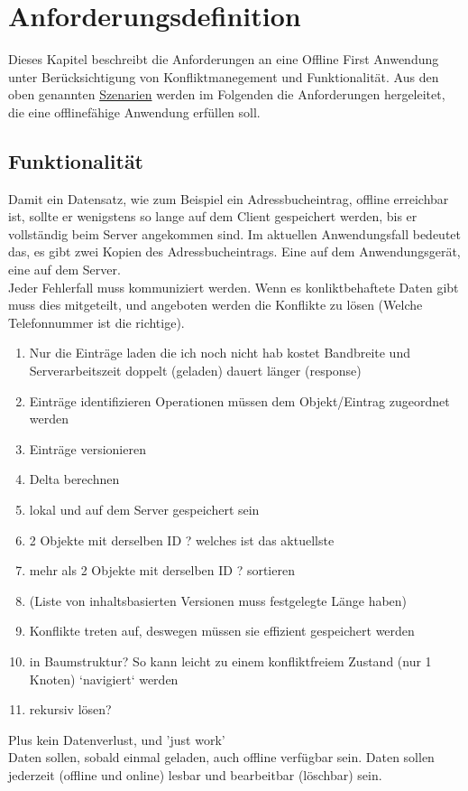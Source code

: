 \chapter{\label{chap:anforderungen}Anforderungsdefinition}
Dieses Kapitel beschreibt die Anforderungen an eine Offline First Anwendung unter Berücksichtigung von Konfliktmanegement und Funktionalität.  Aus den oben genannten \hyperref[chap:szenarien]{Szenarien} werden im Folgenden die Anforderungen hergeleitet, die eine offlinefähige Anwendung  erfüllen soll.
%
%

%
%
\section{Funktionalität}
Damit ein Datensatz, wie zum Beispiel ein Adressbucheintrag, offline erreichbar ist, sollte er wenigstens so lange auf dem Client gespeichert werden, bis er vollständig beim Server angekommen sind. Im aktuellen Anwendungsfall bedeutet das, es gibt zwei Kopien des Adressbucheintrags. Eine auf dem Anwendungsgerät, eine auf dem Server.\\
Jeder Fehlerfall muss kommuniziert werden. Wenn es konliktbehaftete Daten gibt muss dies mitgeteilt, und angeboten werden die Konflikte zu lösen (Welche Telefonnummer ist die richtige).\\
\begin{enumerate}
  \item Nur die Einträge laden die ich noch nicht hab
    \subitem kostet Bandbreite und Serverarbeitszeit
    \subitem doppelt (geladen)
    \subitem dauert länger (response)
  \item Einträge identifizieren
    \subitem Operationen müssen dem Objekt/Eintrag zugeordnet werden
  \item Einträge versionieren
  \item Delta berechnen
  \item lokal und auf dem Server gespeichert sein
  \item 2 Objekte mit derselben ID ? welches ist das aktuellste
  \item mehr als 2 Objekte mit derselben ID ? sortieren
  \item (Liste von inhaltsbasierten Versionen muss festgelegte Länge haben)
  \item Konflikte treten auf, deswegen müssen sie effizient gespeichert werden
  \item in Baumstruktur? So kann leicht zu einem konfliktfreiem Zustand (nur 1 Knoten) `navigiert` werden
  \item rekursiv lösen?
\end{enumerate}
 Plus kein Datenverlust, und 'just work'\\
Daten sollen, sobald einmal geladen, auch offline verfügbar sein.
Daten sollen jederzeit (offline und online) lesbar und bearbeitbar (löschbar) sein.
%
%
